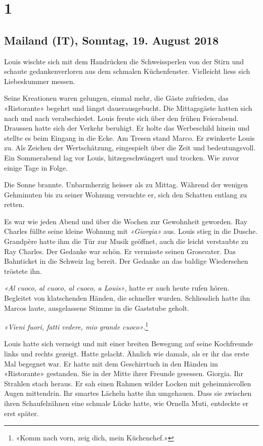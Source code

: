  \chapter{1}
\endgroup

\section{Mailand (IT), Sonntag, 19.
August 2018}



Louis wischte sich mit dem Handrücken die Schweissperlen von der Stirn und schaute gedankenverloren aus dem schmalen Küchenfenster. Vielleicht liess sich Liebeskummer messen.
 
Seine Kreationen waren gelungen, einmal mehr, die Gäste zufrieden, das «Ristorante» begehrt und längst dauerausgebucht. Die Mittagsgäste hatten sich nach und nach verabschiedet. Louis freute sich über den frühen Feierabend. Draussen hatte sich der Verkehr beruhigt. Er holte das Werbeschild hinein und stellte es beim Eingang in die Ecke. Am Tresen stand Marco. Er zwinkerte Louis zu. Als Zeichen der Wertschätzung, eingespielt über die Zeit und bedeutungsvoll.
Ein Sommerabend lag vor Louis, hitzegeschwängert und trocken. Wie zuvor einige Tage in Folge.

Die Sonne brannte. Unbarmherzig heisser als zu Mittag. Während der wenigen Gehminuten bis zu seiner Wohnung versuchte er, sich den Schatten entlang zu retten.

\sectionbreak

Es war wie jeden Abend und über die Wochen zur Gewohnheit geworden. Ray Charles füllte seine kleine Wohnung mit \emph{«Giorgia»} aus. Louis stieg in die Dusche. Grandpère hatte ihm die Tür zur Musik geöffnet, auch die leicht verstaubte zu Ray Charles. Der Gedanke war schön. Er vermisste seinen Grossvater. Das Bahnticket in die Schweiz lag bereit. Der Gedanke an das baldige Wiedersehen tröstete ihn. 
 
\emph{«Al cuoco, al cuoco, al cuoco, a Louis»}, hatte er auch heute rufen hören. Begleitet von klatschenden Händen, die schneller wurden. Schliesslich hatte ihn Marcos laute, ausgelassene Stimme in die Gaststube geholt.

\emph{«Vieni fuori, fatti vedere, mio grande cuoco»}.\footnote{«Komm nach vorn, zeig dich, mein Küchenchef.»}

Louis hatte sich verneigt und mit einer breiten Bewegung auf seine Kochfreunde links und rechts gezeigt. Hatte gelacht. Ähnlich wie damals, als er ihr das erste Mal begegnet war. Er hatte mit dem Geschirrtuch in den Händen im «Ristorante» gestanden. Sie in der Mitte ihrer Freunde gesessen. Giorgia. Ihr Strahlen stach heraus. Er sah einen Rahmen wilder Locken mit geheimnisvollen Augen mittendrin. Ihr smartes Lächeln hatte ihn umgehauen. Dass sie zwischen ihren Schaufelzähnen eine schmale Lücke hatte, wie Ornella Muti, entdeckte er erst später.

